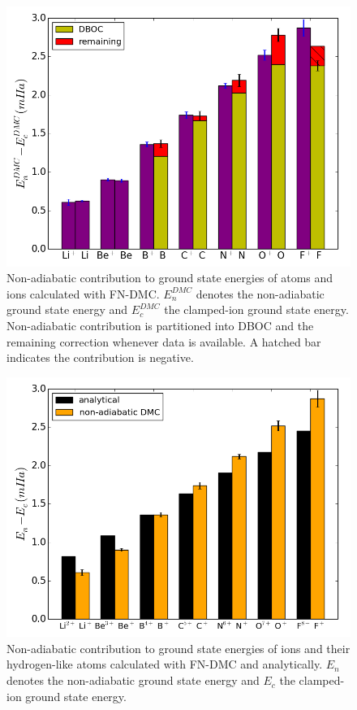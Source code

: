 \documentclass[pra,superscriptaddress,groupedaddress,twocolumn]{revtex4}
\begin{document}
\begin{figure}[h]
\includegraphics[scale=.37]{Figures/atom-nad-ad}
\caption{Non-adiabatic contribution to ground state energies of atoms and ions calculated with FN-DMC. $E_n^{DMC}$ denotes the non-adiabatic ground state energy and $E_c^{DMC}$ the clamped-ion ground state energy. Non-adiabatic contribution is partitioned into DBOC and the remaining correction whenever data is available. A hatched bar indicates the contribution is negative. \label{fig:atom-nad-ad}} %
\end{figure}

\begin{figure}[h]
\includegraphics[scale=.4]{Figures/analytical}
\caption{Non-adiabatic contribution to ground state energies of ions and their hydrogen-like atoms calculated with FN-DMC and analytically. $E_n$ denotes the non-adiabatic ground state energy and $E_c$ the clamped-ion ground state energy. \label{fig:analytical}}
\end{figure}
\end{document}
